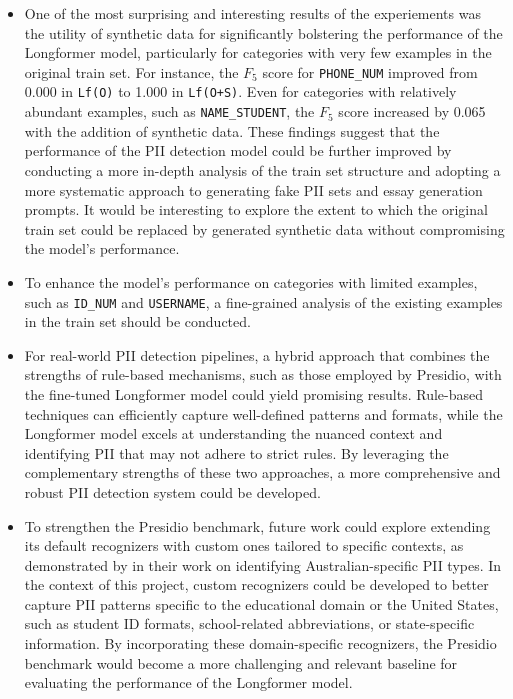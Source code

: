 \documentclass[11pt]{article}
\begin{document}
\begin{itemize}
\item One of the most surprising and interesting results of the experiements was the utility of synthetic data for significantly bolstering the performance of the Longformer model, particularly for categories with very few examples in the original train set. For instance, the $F_5$ score for \texttt{PHONE\_NUM} improved from 0.000 in \texttt{Lf(O)} to 1.000 in \texttt{Lf(O+S)}. Even for categories with relatively abundant examples, such as \texttt{NAME\_STUDENT}, the $F_5$ score increased by 0.065 with the addition of synthetic data. These findings suggest that the performance of the PII detection model could be further improved by conducting a more in-depth analysis of the train set structure and adopting a more systematic approach to generating fake PII sets and essay generation prompts. It would be interesting to explore the extent to which the original train set could be replaced by generated synthetic data without compromising the model's performance.
\item To enhance the model's performance on categories with limited examples, such as \texttt{ID\_NUM} and \texttt{USERNAME}, a fine-grained analysis of the existing examples in the train set should be conducted.
\item For real-world PII detection pipelines, a hybrid approach that combines the strengths of rule-based mechanisms, such as those employed by Presidio, with the fine-tuned Longformer model could yield promising results. Rule-based techniques can efficiently capture well-defined patterns and formats, while the Longformer model excels at understanding the nuanced context and identifying PII that may not adhere to strict rules. By leveraging the complementary strengths of these two approaches, a more comprehensive and robust PII detection system could be developed. 
\item To strengthen the Presidio benchmark, future work could explore extending its default recognizers with custom ones tailored to specific contexts, as demonstrated by \citealt{AzizStraiton2023PIIDetection} in their work on identifying Australian-specific PII types. In the context of this project, custom recognizers could be developed to better capture PII patterns specific to the educational domain or the United States, such as student ID formats, school-related abbreviations, or state-specific information. By incorporating these domain-specific recognizers, the Presidio benchmark would become a more challenging and relevant baseline for evaluating the performance of the Longformer model.
\end{itemize}
\end{document}

